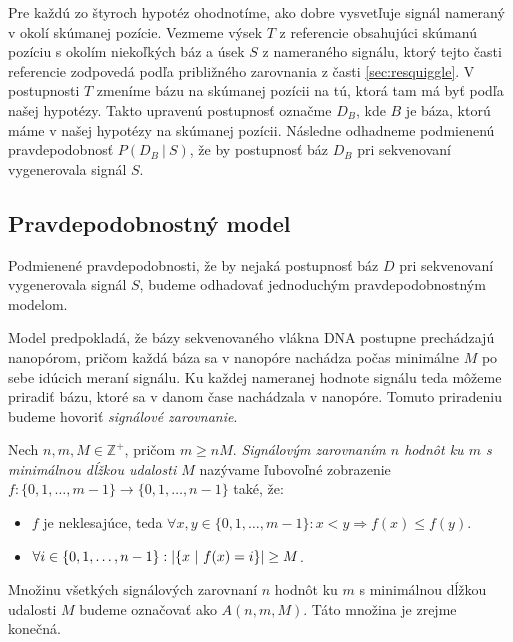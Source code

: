 
Pre každú zo štyroch hypotéz ohodnotíme, ako dobre vysvetľuje signál nameraný v okolí skúmanej
pozície. Vezmeme výsek $T$ z referencie obsahujúci skúmanú pozíciu s okolím niekoľkých báz a úsek $S$
z nameraného signálu, ktorý tejto časti referencie zodpovedá podľa približného zarovnania 
z časti \ref{sec:resquiggle}. V postupnosti $T$ zmeníme bázu na skúmanej pozícii na tú, ktorá 
tam má byť podľa našej hypotézy. Takto upravenú postupnosť označme $D_B$, kde $B$ je báza, ktorú
máme v našej hypotézy na skúmanej pozícii. 
Následne odhadneme podmienenú pravdepodobnosť $P(D_B ~|~ S)$, že by postupnosť báz $D_B$ pri sekvenovaní vygenerovala signál $S$.

\subsection{Pravdepodobnostný model}

Podmienené pravdepodobnosti, že by nejaká postupnosť báz $D$ pri sekvenovaní vygenerovala signál $S$,
budeme odhadovať jednoduchým pravdepodobnostným modelom.

Model predpokladá, že bázy sekvenovaného vlákna DNA postupne prechádzajú nanopórom, pričom
každá báza sa v nanopóre nachádza počas minimálne $M$ po sebe idúcich meraní signálu. Ku každej
nameranej hodnote signálu teda môžeme priradiť bázu, ktoré sa v danom čase nachádzala v nanopóre.
Tomuto priradeniu budeme hovoriť \emph{signálové zarovnanie}.

\begin{definicia}

Nech $n, m, M \in \mathbb{Z}^+$, pričom $m \geq n M$. \emph{Signálovým zarovnaním $n$ hodnôt ku $m$ s
 minimálnou dĺžkou udalosti $M$} nazývame ľubovoľné zobrazenie $f: \{0, 1, \dots, m-1\} \rightarrow \{0, 1, \dots, n-1\}$
také, že:

\begin{itemize}
\item $f$ je neklesajúce, teda $\forall x, y \in \{0, 1, \dots, m-1\}: x < y \Rightarrow f(x) \leq f(y)$.
\item $\forall i \in \{0, 1, \dots, n-1\}: \abs*{\{x ~|~ f(x) = i\}} \geq M$.
\end{itemize}

Množinu všetkých signálových zarovnaní $n$ hodnôt ku $m$ s minimálnou dĺžkou udalosti $M$ budeme označovať ako
$A(n, m, M)$. Táto množina je zrejme konečná.

\end{definicia}

